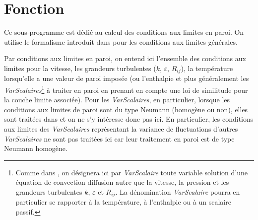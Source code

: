 %
%
%
%
%
%
%
%


\vspace{1cm}
\section{Fonction}
Ce sous-programme est d\'edi\'e au calcul des conditions aux limites en paroi.
On utilise le formalisme introduit dans  pour les conditions
aux limites g\'en\'erales.

Par conditions aux limites en paroi, on entend ici l'ensemble des conditions aux
limites pour la vitesse, les grandeurs turbulentes ($k$, $\varepsilon$,
$R_{ij}$), la temp\'erature lorsqu'elle a une valeur de paroi impos\'ee
(ou l'enthalpie et plus g\'en\'eralement les
{\it VarScalaires}\footnote{Comme dans , on d\'esignera ici par
{\it VarScalaire} toute variable solution
d'une \'equation de convection-diffusion autre que la
vitesse, la pression et les grandeurs turbulentes $k$, $\varepsilon$ et
$R_{ij}$. La d\'enomination {\it VarScalaire} pourra en particulier se rapporter
\`a la temp\'erature, \`a l'enthalpie ou \`a un scalaire passif.}
\`a traiter en paroi en prenant en compte une loi de similitude
pour la couche limite associ\'ee). Pour les {\it VarScalaires}, en particulier,
lorsque les conditions aux limites de paroi sont du type Neumann (homog\`ene ou non),
elles sont trait\'ees dans  et on ne s'y int\'eresse donc pas
ici. En particulier, les conditions aux limites des  {\it VarScalaires}
repr\'esentant la variance de fluctuations d'autres  {\it VarScalaires} ne
sont pas trait\'ees ici car leur traitement en paroi est de type Neumann homog\`ene.

